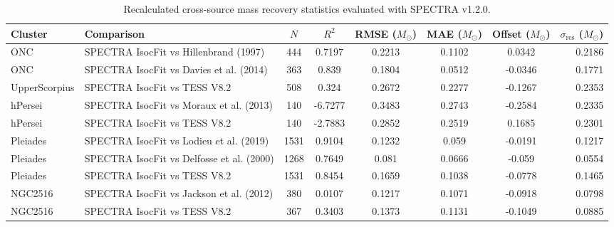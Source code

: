 \begin{table}
\centering
\caption{Recalculated cross-source mass recovery statistics evaluated with \textsc{SPECTRA} v1.2.0.}
\label{tab:recalculated_cross_source_stats}
\begin{tabular}{llcccccr}
\hline
Cluster & Comparison & $N$ & $R^2$ & RMSE ($M_\odot$) & MAE ($M_\odot$) & Offset ($M_\odot$) & $\sigma_{\text{res}}$ ($M_\odot$) \\
\hline
ONC & SPECTRA IsocFit vs Hillenbrand (1997) & 444 & 0.7197 & 0.2213 & 0.1102 & 0.0342 & 0.2186 \\
ONC & SPECTRA IsocFit vs Davies et al. (2014) & 363 & 0.839 & 0.1804 & 0.0512 & -0.0346 & 0.1771 \\
UpperScorpius & SPECTRA IsocFit vs TESS V8.2 & 508 & 0.324 & 0.2672 & 0.2277 & -0.1267 & 0.2353 \\
hPersei & SPECTRA IsocFit vs Moraux et al. (2013) & 140 & -6.7277 & 0.3483 & 0.2743 & -0.2584 & 0.2335 \\
hPersei & SPECTRA IsocFit vs TESS V8.2 & 140 & -2.7883 & 0.2852 & 0.2519 & 0.1685 & 0.2301 \\
Pleiades & SPECTRA IsocFit vs Lodieu et al. (2019) & 1531 & 0.9104 & 0.1232 & 0.059 & -0.0191 & 0.1217 \\
Pleiades & SPECTRA IsocFit vs Delfosse et al. (2000) & 1268 & 0.7649 & 0.081 & 0.0666 & -0.059 & 0.0554 \\
Pleiades & SPECTRA IsocFit vs TESS V8.2 & 1531 & 0.8454 & 0.1659 & 0.1038 & -0.0778 & 0.1465 \\
NGC2516 & SPECTRA IsocFit vs Jackson et al. (2012) & 380 & 0.0107 & 0.1217 & 0.1071 & -0.0918 & 0.0798 \\
NGC2516 & SPECTRA IsocFit vs TESS V8.2 & 367 & 0.3403 & 0.1373 & 0.1131 & -0.1049 & 0.0885 \\
\hline
\end{tabular}
\end{table}